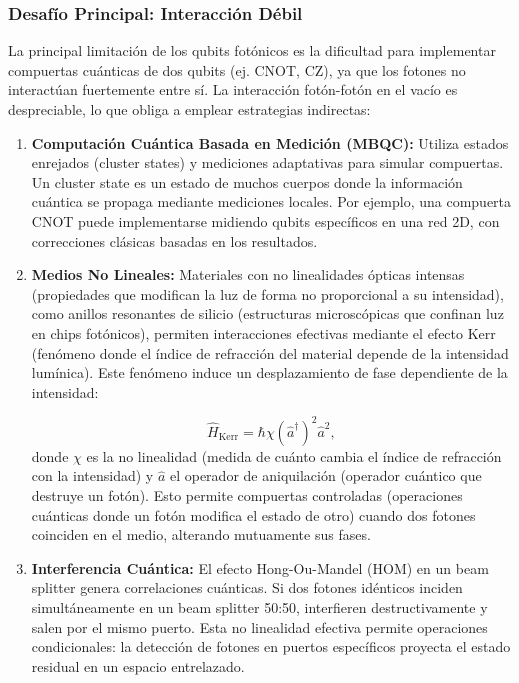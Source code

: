 \documentclass{article}
\begin{document}
\subsubsection*{Desafío Principal: Interacción Débil}

La principal limitación de los qubits fotónicos es la dificultad para implementar compuertas cuánticas de dos qubits (ej. CNOT, CZ), ya que los fotones no interactúan fuertemente entre sí. La interacción fotón-fotón en el vacío es despreciable, lo que obliga a emplear estrategias indirectas:

\begin{enumerate}
    \item \textbf{Computación Cuántica Basada en Medición (MBQC):}  
    Utiliza estados enrejados (cluster states) y mediciones adaptativas para simular compuertas. Un cluster state es un estado de muchos cuerpos donde la información cuántica se propaga mediante mediciones locales. Por ejemplo, una compuerta CNOT puede implementarse midiendo qubits específicos en una red 2D, con correcciones clásicas basadas en los resultados.

    \item \textbf{Medios No Lineales:}  
Materiales con no linealidades ópticas intensas (propiedades que modifican la luz de forma no proporcional a su intensidad), como anillos resonantes de silicio (estructuras microscópicas que confinan luz en chips fotónicos), permiten interacciones efectivas mediante el efecto Kerr (fenómeno donde el índice de refracción del material depende de la intensidad lumínica). Este fenómeno induce un desplazamiento de fase dependiente de la intensidad:

\[
\hat{H}_{\text{Kerr}} = \hbar \chi (\hat{a}^\dagger)^2 \hat{a}^2,
\]
donde \(\chi\) es la no linealidad (medida de cuánto cambia el índice de refracción con la intensidad) y \(\hat{a}\) el operador de aniquilación (operador cuántico que destruye un fotón). Esto permite compuertas controladas (operaciones cuánticas donde un fotón modifica el estado de otro) cuando dos fotones coinciden en el medio, alterando mutuamente sus fases.

    \item \textbf{Interferencia Cuántica:}  
    El efecto Hong-Ou-Mandel (HOM) en un beam splitter genera correlaciones cuánticas. Si dos fotones idénticos inciden simultáneamente en un beam splitter 50:50, interfieren destructivamente y salen por el mismo puerto. Esta no linealidad efectiva permite operaciones condicionales: la detección de fotones en puertos específicos proyecta el estado residual en un espacio entrelazado.
\end{enumerate}
\end{document}
